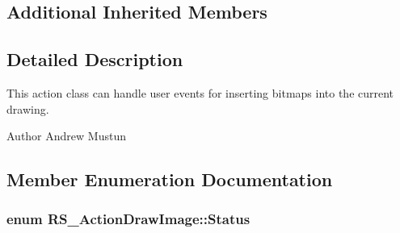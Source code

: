 \subsection*{Additional Inherited Members}


\subsection{Detailed Description}
This action class can handle user events for inserting bitmaps into the current drawing.

\begin{DoxyAuthor}{Author}
Andrew Mustun 
\end{DoxyAuthor}


\subsection{Member Enumeration Documentation}
\hypertarget{classRS__ActionDrawImage_ab906c07719d324614762be6778aa8b8b}{
\subsubsection[{Status}]{\setlength{\rightskip}{0pt plus 5cm}enum {\bf R\-S\-\_\-\-Action\-Draw\-Image\-::\-Status}}}\label{classRS__ActionDrawImage_ab906c07719d324614762be6778aa8b8b}
